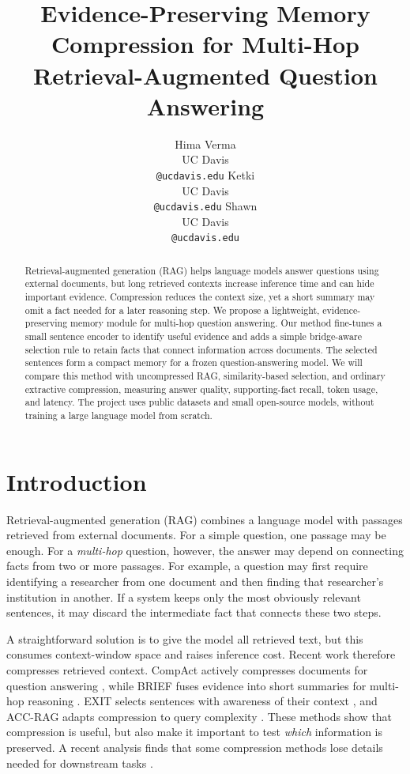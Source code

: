 \documentclass[11pt]{article}
\title{Evidence-Preserving Memory Compression for Multi-Hop Retrieval-Augmented Question Answering}
\author{Hima Verma  \\
  UC Davis \\
  \texttt{@ucdavis.edu} \And
  Ketki \\
  UC Davis \\
  \texttt{@ucdavis.edu} \And
  Shawn\\
  UC Davis \\
  \texttt{@ucdavis.edu}}
\begin{document}
\maketitle

\begin{abstract}
Retrieval-augmented generation (RAG) helps language models answer questions using external documents, but long retrieved contexts increase inference time and can hide important evidence. Compression reduces the context size, yet a short summary may omit a fact needed for a later reasoning step. We propose a lightweight, evidence-preserving memory module for multi-hop question answering. Our method fine-tunes a small sentence encoder to identify useful evidence and adds a simple bridge-aware selection rule to retain facts that connect information across documents. The selected sentences form a compact memory for a frozen question-answering model. We will compare this method with uncompressed RAG, similarity-based selection, and ordinary extractive compression, measuring answer quality, supporting-fact recall, token usage, and latency. The project uses public datasets and small open-source models, without training a large language model from scratch.
\end{abstract}

\section{Introduction}

Retrieval-augmented generation (RAG) combines a language model with passages retrieved from external documents. For a simple question, one passage may be enough. For a \emph{multi-hop} question, however, the answer may depend on connecting facts from two or more passages. For example, a question may first require identifying a researcher from one document and then finding that researcher's institution in another. If a system keeps only the most obviously relevant sentences, it may discard the intermediate fact that connects these two steps.

A straightforward solution is to give the model all retrieved text, but this consumes context-window space and raises inference cost. Recent work therefore compresses retrieved context. CompAct actively compresses documents for question answering \citep{yoon-etal-2024-compact}, while BRIEF fuses evidence into short summaries for multi-hop reasoning \citep{li-etal-2025-brief}. EXIT selects sentences with awareness of their context \citep{hwang-etal-2025-exit}, and ACC-RAG adapts compression to query complexity \citep{guo-etal-2025-enhancing}. These methods show that compression is useful, but also make it important to test \emph{which} information is preserved. A recent analysis finds that some compression methods lose details needed for downstream tasks \citep{lajewska-etal-2025-understanding}.
\end{document}
